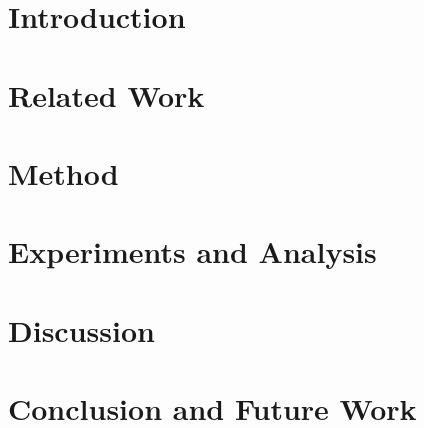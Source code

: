 \begin{abstract}

\lipsum[1-2]
\end{abstract}

\section{Introduction}
\lipsum \cite{Goodfellow2014Generative}

\section{Related Work}
\lipsum

\section{Method}
\lipsum

\section{Experiments and Analysis}
\lipsum

\section{Discussion}
\lipsum

\section{Conclusion and Future Work}
\lipsum